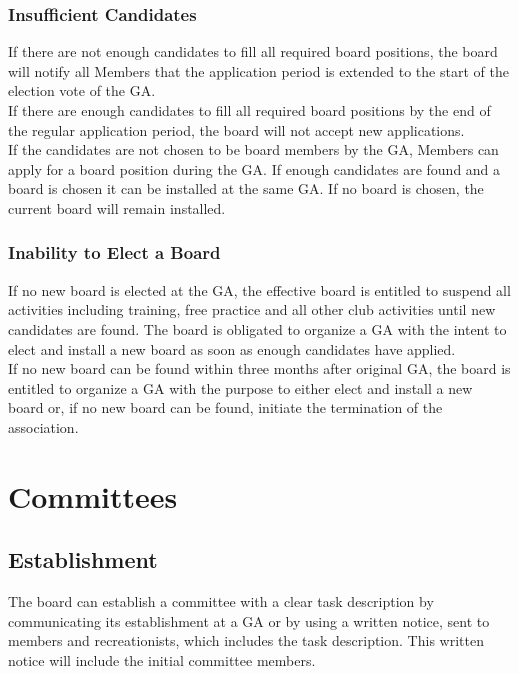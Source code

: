 \documentclass[a4paper]{article}
\begin{document}
\subsubsection{Insufficient Candidates}

If there are not enough candidates to fill all required board positions, the board will notify all Members that the application period is extended to the start of the election vote of the GA. \\

If there are enough candidates to fill all required board positions by the end of the regular application period, the board will not accept new applications. \\

If the candidates are not chosen to be board members by the GA, Members can apply for a board position during the GA. If enough candidates are found and a board is chosen it can be installed at the same GA. If no board is chosen, the current board will remain installed. \\

\subsubsection{Inability to Elect a Board}

If no new board is elected at the GA, the effective board is entitled to suspend all activities including training, free practice and all other club activities until new candidates are found. The board is obligated to organize a GA with the intent to elect and install a new board as soon as enough candidates have applied. \\

If no new board can be found within three months after original GA, the board is entitled to organize a GA with the purpose to either elect and install a new board or, if no new board can be found, initiate the termination of the association.

\section{Committees}
\subsection{Establishment}
The board can establish a committee with a clear task description by communicating its establishment at a GA or by using a written notice, sent to members and recreationists, which includes the task description. This written notice will include the initial committee members.
\end{document}
